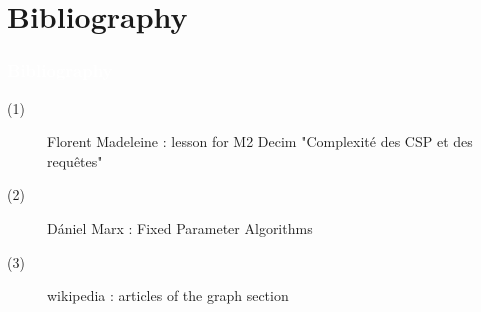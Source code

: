 \documentclass[8pt]{beamer}
\begin{document}



    









\section{Bibliography}

\begin{frame}
  \frametitle{ \textcolor{white}{Bibliography}}

  \begin{description}
  \item[(1)] Florent Madeleine : lesson for M2 Decim "Complexité des CSP et des requêtes"
  \item[(2)] Dániel Marx : Fixed Parameter Algorithms
  \item[(3)] wikipedia : articles of the graph section
    \end{description}
\end{frame}
\end{document}
